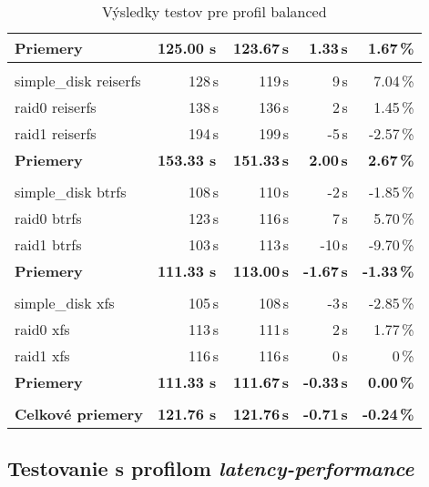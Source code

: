 \begin{table}[H]
\begin{center}
\begin{tabular}{|l|r r r r|}
    \textbf{Priemery} & \textbf{125.00 s}\,& \textbf{123.67\,s} & \textbf{1.33\,s} & \textbf{1.67\,\%} \\
    \hline & \\[-1em]\hline
    simple\_disk reiserfs & 128\,s & 119\,s & 9\,s & 7.04\,\% \\
    raid0 reiserfs & 138\,s & 136\,s & 2\,s & 1.45\,\% \\
    raid1 reiserfs & 194\,s & 199\,s & -5\,s & -2.57\,\% \\
    \hline
    \textbf{Priemery} & \textbf{153.33 s}\,& \textbf{151.33\,s} & \textbf{2.00\,s} & \textbf{2.67\,\%} \\
    \hline & \\[-1em]\hline
    simple\_disk btrfs & 108\,s & 110\,s & -2\,s & -1.85\,\% \\
    raid0 btrfs & 123\,s & 116\,s & 7\,s & 5.70\,\% \\
    raid1 btrfs & 103\,s & 113\,s & -10\,s & -9.70\,\% \\
    \hline
    \textbf{Priemery} & \textbf{111.33 s}\,& \textbf{113.00\,s} & \textbf{-1.67\,s} & \textbf{-1.33\,\%} \\
    \hline & \\[-1em]\hline
    simple\_disk xfs & 105\,s & 108\,s & -3\,s & -2.85\,\% \\
    raid0 xfs & 113\,s & 111\,s & 2\,s & 1.77\,\% \\
    raid1 xfs & 116\,s & 116\,s & 0\,s & 0\,\% \\
    \hline
    \textbf{Priemery} & \textbf{111.33 s}\,& \textbf{111.67\,s} & \textbf{-0.33\,s} & \textbf{0.00\,\%} \\
    \hline & \\[-1em]\hline
    \textbf{Celkové priemery} & \textbf{121.76 s}\,& \textbf{121.76\,s} & \textbf{-0.71\,s} & \textbf{-0.24\,\%} \\
    \hline
\end{tabular}
\caption{Výsledky testov pre profil balanced}
\label{tab:results-xfs}
\end{center}
\end{table}

\subsection{Testovanie s profilom \emph{latency-performance}}

